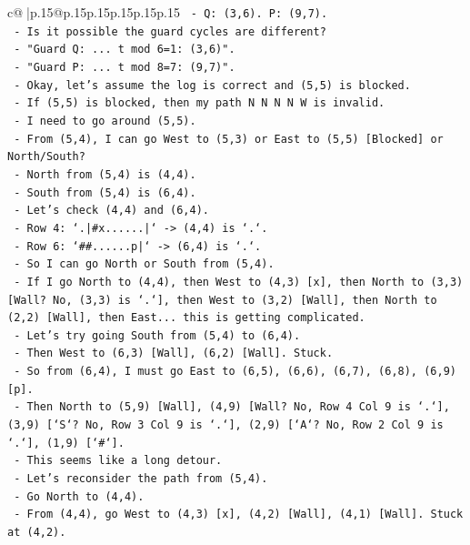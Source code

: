 \documentclass{article}
\begin{document}
{\begin{supertabular}{c@{$\;$}|p{.15\linewidth}@{}p{.15\linewidth}p{.15\linewidth}p{.15\linewidth}p{.15\linewidth}p{.15\linewidth}}
{{{\texttt{  {-} Q: (3,6). P: (9,7).} \\
\texttt{  {-} Is it possible the guard cycles are different?} \\
\texttt{  {-} "Guard Q: ... t mod 6=1: (3,6)".} \\
\texttt{  {-} "Guard P: ... t mod 8=7: (9,7)".} \\
\texttt{  {-} Okay, let's assume the log is correct and (5,5) is blocked.} \\
\texttt{  {-} If (5,5) is blocked, then my path N N N N W is invalid.} \\
\texttt{  {-} I need to go around (5,5).} \\
\texttt{  {-} From (5,4), I can go West to (5,3) or East to (5,5) {[}Blocked{]} or North/South?} \\
\texttt{  {-} North from (5,4) is (4,4).} \\
\texttt{  {-} South from (5,4) is (6,4).} \\
\texttt{  {-} Let's check (4,4) and (6,4).} \\
\texttt{  {-} Row 4: `.|\#x......|` {-}> (4,4) is `.`.} \\
\texttt{  {-} Row 6: `\#\#......p|` {-}> (6,4) is `.`.} \\
\texttt{  {-} So I can go North or South from (5,4).} \\
\texttt{  {-} If I go North to (4,4), then West to (4,3) {[}x{]}, then North to (3,3) {[}Wall? No, (3,3) is `.`{]}, then West to (3,2) {[}Wall{]}, then North to (2,2) {[}Wall{]}, then East... this is getting complicated.} \\
\texttt{  {-} Let's try going South from (5,4) to (6,4).} \\
\texttt{  {-} Then West to (6,3) {[}Wall{]}, (6,2) {[}Wall{]}. Stuck.} \\
\texttt{  {-} So from (6,4), I must go East to (6,5), (6,6), (6,7), (6,8), (6,9) {[}p{]}.} \\
\texttt{  {-} Then North to (5,9) {[}Wall{]}, (4,9) {[}Wall? No, Row 4 Col 9 is `.`{]}, (3,9) {[}`S`? No, Row 3 Col 9 is `.`{]}, (2,9) {[}`A`? No, Row 2 Col 9 is `.`{]}, (1,9) {[}`\#`{]}.} \\
\texttt{  {-} This seems like a long detour.} \\
\texttt{  {-} Let's reconsider the path from (5,4).} \\
\texttt{  {-} Go North to (4,4).} \\
\texttt{  {-} From (4,4), go West to (4,3) {[}x{]}, (4,2) {[}Wall{]}, (4,1) {[}Wall{]}. Stuck at (4,2).} \\
}}}
\end{supertabular}}
\end{document}
